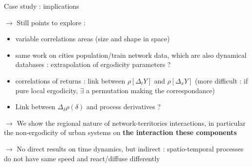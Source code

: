%
%
%
%
%
%
%




Case study : implications

$\rightarrow$ Still points to explore :
\begin{itemize}
\item variable correlations areas (size and shape in space)
\item same work on cities population/train network data, which are also dynamical databases : extrapolation of ergodicity parameters ?
\item correlations of returns : link between $\rho\left[\Delta_t Y\right]$ and $\rho\left[\Delta_x Y\right]$ (more difficult : if pure local ergodicity, $\exists$ a permutation making the correspondance) %
\item Link between $\Delta_{\delta}\rho (\delta)$ and process derivatives ?
\end{itemize}

\bigskip

$\rightarrow$ We show the regional nature of network-territories interactions, in particular the non-ergodicity of urban systems on \textbf{the interaction these components}

\bigskip

$\rightarrow$ No direct results on time dynamics, but indirect : spatio-temporal processes do not have same speed and react/diffuse differently
















